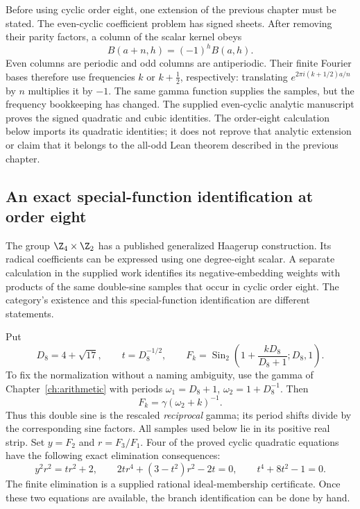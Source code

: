 Before using cyclic order eight, one extension of the previous
chapter must be stated. The even-cyclic coefficient problem has
signed sheets. After removing their parity factors, a column of
the scalar kernel obeys
\[
 B(a+n,h)=(-1)^h B(a,h).
\]
Even columns are periodic and odd columns are antiperiodic.
Their finite Fourier bases therefore use frequencies
$k$ or $k+\tfrac12$, respectively: translating
$e^{2\pi i(k+1/2)a/n}$ by $n$ multiplies it by $-1$.
The same gamma function supplies the samples, but the frequency
bookkeeping has changed. The supplied even-cyclic analytic
manuscript proves the signed quadratic and cubic identities.
The order-eight calculation below imports its quadratic identities;
it does not reprove that analytic extension or claim that it belongs
to the all-odd Lean theorem described in the previous chapter.

\subsection{An exact special-function identification at order eight}

The group $\Z_4\times\Z_2$ has a published generalized Haagerup
construction. Its radical coefficients can be expressed using one
degree-eight scalar. A separate calculation in the supplied work
identifies its negative-embedding weights with products of the same
double-sine samples that occur in cyclic order eight. The category's
existence and this special-function identification are different
statements.

Put
\[
 D_8=4+\sqrt{17},\qquad t=D_8^{-1/2},\qquad
 F_k=\operatorname{Sin}_2\left(1+\frac{kD_8}{D_8+1};D_8,1\right).
\]
To fix the normalization without a naming ambiguity, use the gamma
of Chapter~\ref{ch:arithmetic} with periods
$\omega_1=D_8+1$, $\omega_2=1+D_8^{-1}$. Then
\[
 F_k=\gamma(\omega_2+k)^{-1}.
\]
Thus this double sine is the rescaled \emph{reciprocal} gamma;
its period shifts divide by the corresponding sine factors.
All samples used below lie in its positive real strip.
Set $y=F_2$ and $r=F_3/F_1$.
Four of the proved cyclic quadratic equations have the following
exact elimination consequences:
\begin{equation}
 y^2r^2=tr^2+2,\qquad
 2tr^4+(3-t^2)r^2-2t=0,
 \qquad t^4+8t^2-1=0.
 \label{eq:noncyclic-eight-eliminants}
\end{equation}
The finite elimination is a supplied rational ideal-membership
certificate. Once these two equations are available, the branch
identification can be done by hand.

